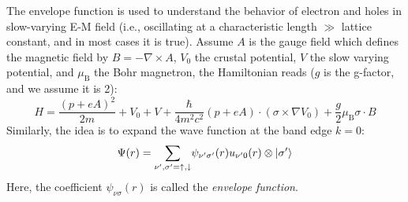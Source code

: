 \documentclass{article}
\begin{document}
The envelope function is used to understand the behavior of electron and holes in slow-varying E-M field (i.e., oscillating at a characteristic length $\gg$ lattice constant, and in most cases it is true). Assume $A$ is the gauge field which defines the magnetic field by $B = -\nabla \times A$, $V_0$ the crustal potential, $V$ the slow varying potential, and $\mu_\text{B}$ the Bohr magnetron, the Hamiltonian reads ($g$ is the g-factor, and we assume it is 2):
\begin{equation}
    H = \frac{(p + e A)^2}{2 m} + V_0 + V + \frac{\hbar}{4 m^2 c^2} (p + e A)\cdot (\sigma \times \nabla V_0) + \frac{g}{2} \mu_{\text{B}} \sigma \cdot B
\end{equation}
Similarly, the idea is to expand the wave function at the band edge $k=0$:
\begin{equation}
    \Psi (r) = \underset{\nu', \sigma' = \uparrow, \downarrow}{\sum} \psi_{\nu' \sigma'} (r) u_{\nu' 0} (r) \otimes \ket{ \sigma'}
\end{equation}
Here, the coefficient $\psi_{\nu\sigma}(r)$ is called the \textit{envelope function}.
\end{document}
